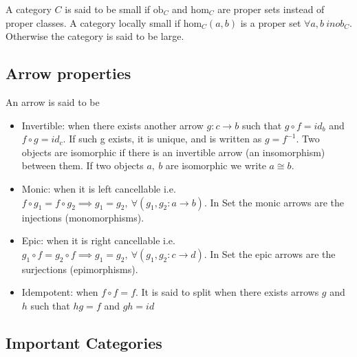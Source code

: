 \noindent A category $C$ is said to be small if $\mathrm{ob}_C$ and
$\mathrm{hom}_C$ are proper sets instead of proper classes. A category locally
small if $\mathrm{hom}_C(a, b)$ is a proper set $\forall a, b\ in ob_C$.
Otherwise the category is said to be large. \cite{nlab:category}
\medskip

\subsection{Arrow properties}
\noindent\cite{categories_working_mathematician} An arrow is said to be
\begin{itemize}
  \item Invertible: when there exists another arrow $g:c \to b$ such that
    $g\circ f = id_b$ and $f\circ g = id_c$. If such g exists, it is unique, and
    is written as $g= f^{-1}$. Two objects are isomorphic if there is an
    invertible arrow (an insomorphism) between them. If two objects $a,\ b$
    are isomorphic we write $a\cong b$.
  \item Monic: when it is left cancellable i.e.
    $f \circ g_1 = f \circ g_2 \implies g_1 = g_2,\ \forall (g_1, g_2:a\to b)$.
    In Set the monic arrows are the injections (monomorphisms).
  \item Epic: when it is right cancellable i.e.
    $g_1 \circ f = g_2 \circ f \implies g_1 = g_2,\ \forall (g_1, g_2: c\to d)$.
    In Set the epic arrows are the surjections (epimorphisms).
  \item Idempotent: when $f\circ f = f$. It is said to split when there exists
    arrows $g$ and $h$ such that $hg = f$ and $gh = id$
\end{itemize}

\subsection{Important Categories}


